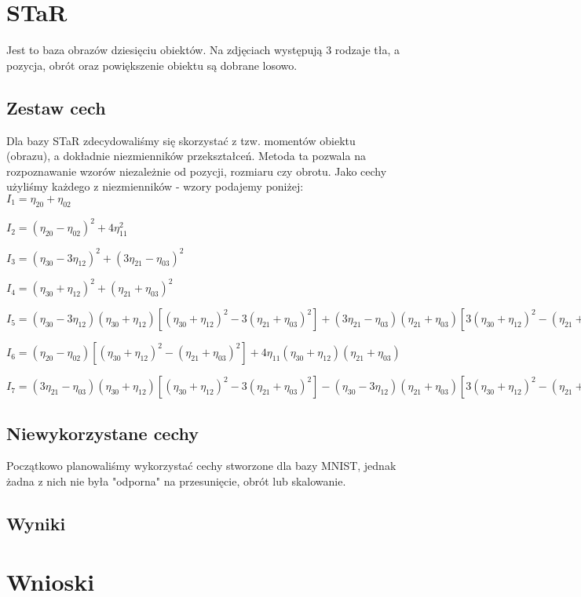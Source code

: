 \documentclass{classrep}
\begin{document}
\section{STaR}

Jest to baza obrazów dziesięciu obiektów. Na zdjęciach występują 3 rodzaje tła, a pozycja, obrót oraz powiększenie obiektu są dobrane losowo.

\subsection{Zestaw cech}

Dla bazy STaR zdecydowaliśmy się skorzystać z tzw. momentów obiektu (obrazu), a dokładnie niezmienników przekształceń. Metoda ta pozwala na rozpoznawanie wzorów  niezależnie od pozycji, rozmiaru czy obrotu. Jako cechy użyliśmy każdego z niezmienników - wzory podajemy poniżej:\\

$I_1 = \eta_{20} + \eta_{02}$

$I_2 = (\eta_{20} - \eta_{02})^2 + 4\eta_{11}^2$

$I_3 = (\eta_{30} - 3\eta_{12})^2 + (3\eta_{21} - \eta_{03})^2$

$ I_4 = (\eta_{30} + \eta_{12})^2 + (\eta_{21} + \eta_{03})^2$

$ I_5 = (\eta_{30} - 3\eta_{12}) (\eta_{30} + \eta_{12})[ (\eta_{30} + \eta_{12})^2 - 3 (\eta_{21} + \eta_{03})^2] + (3 \eta_{21} - \eta_{03}) (\eta_{21} + \eta_{03})[ 3(\eta_{30} + \eta_{12})^2 -  (\eta_{21} + \eta_{03})^2]$

$I_6 =  (\eta_{20} - \eta_{02})[(\eta_{30} + \eta_{12})^2 - (\eta_{21} + \eta_{03})^2] + 4\eta_{11}(\eta_{30} + \eta_{12})(\eta_{21} + \eta_{03})$

$I_7 = (3 \eta_{21} - \eta_{03})(\eta_{30} + \eta_{12})[(\eta_{30} + \eta_{12})^2 - 3(\eta_{21} + \eta_{03})^2] - (\eta_{30} - 3\eta_{12})(\eta_{21} + \eta_{03})[3(\eta_{30} + \eta_{12})^2 - (\eta_{21} + \eta_{03})^2]$

\subsection{Niewykorzystane cechy}

Początkowo planowaliśmy wykorzystać cechy stworzone dla bazy MNIST, jednak żadna z nich nie była "odporna" na przesunięcie, obrót lub skalowanie.

\subsection{Wyniki}

\section{Wnioski}
\end{document}
